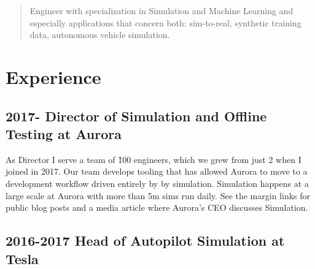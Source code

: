 \maketitle
{}


\begin{abstract}
Engineer with specialization in Simulation and Machine Learning and especially applications that concern both: sim-to-real, synthetic training data, autonomous vehicle simulation.
\end{abstract}

\section{Experience}

\subsection{2017- Director of Simulation and Offline Testing at Aurora}


As Director I serve a team of \~100 engineers, which we grew from just 2 when I joined in 2017. Our team develops tooling that has allowed Aurora to move to a development workflow driven entirely by by simulation. Simulation happens at a large scale at Aurora with more than 5m sims run daily. See the margin links for public blog posts and a media article where Aurora's CEO discusses Simulation.

\subsection{2016-2017 Head of Autopilot Simulation at Tesla}

